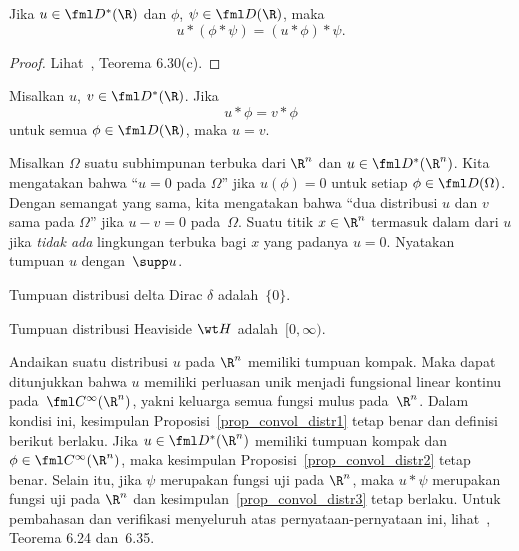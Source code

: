 \begin{prop}\label{prop_convol_distr3} Jika $u \in \fml D^*(\R)$ dan $\phi$, $\psi \in \fml D(\R)$, maka
   \[ u \ast (\phi \ast \psi) = (u \ast \phi) \ast \psi. \]
\end{prop}

\begin{proof} Lihat~\cite{Rudin:1991}, Teorema 6.30(c).  \ns
\end{proof}

\begin{prop} Misalkan $u$, $v \in \fml D^*(\R)$. Jika
   \[ u \ast \phi = v \ast \phi \]
untuk semua $\phi \in \fml D(\R)$, maka $ u = v$.
\end{prop}

\begin{defn} Misalkan $\Omega$ suatu subhimpunan terbuka dari $\R^n$ dan $u \in \fml D^*(\R^n)$. Kita mengatakan bahwa ``$u = 0$ pada $\Omega$'' jika $u(\phi) = 0$
untuk setiap $\phi \in \fml D(\Omega)$. Dengan semangat yang sama, kita mengatakan bahwa ``dua distribusi $u$ dan $v$ sama pada $\Omega$'' jika $u - v = 0$
pada~$\Omega$. Suatu titik $x \in \R^n$ termasuk dalam
 dari $u$ jika \emph{tidak ada} lingkungan terbuka bagi $x$ yang padanya $u = 0$. Nyatakan tumpuan $u$ dengan~$\supp u$.
\end{defn}

\begin{exam} Tumpuan distribusi delta Dirac $\delta$ adalah~$\{0\}$.
\end{exam}

\begin{exam} Tumpuan distribusi Heaviside $\wt H$ adalah~$[0,\infty)$.
\end{exam}

\begin{rem} Andaikan suatu distribusi $u$ pada $\R^n$ memiliki tumpuan kompak. Maka dapat ditunjukkan bahwa $u$ memiliki perluasan unik menjadi
fungsional linear kontinu pada~$\fml C^\infty(\R^n)$, yakni keluarga semua fungsi mulus pada~$\R^n$. Dalam kondisi ini, kesimpulan
Proposisi~\ref{prop_convol_distr1} tetap benar dan definisi berikut berlaku. Jika $u \in \fml D^*(\R^n)$ memiliki tumpuan kompak
dan $\phi \in \fml C^\infty(\R^n)$, maka kesimpulan Proposisi~\ref{prop_convol_distr2} tetap benar. Selain itu, jika $\psi$
merupakan fungsi uji pada $\R^n$, maka $u \ast \psi$ merupakan fungsi uji pada $\R^n$ dan kesimpulan~\ref{prop_convol_distr3} tetap berlaku.
Untuk pembahasan dan verifikasi menyeluruh atas pernyataan-pernyataan ini, lihat~\cite{Rudin:1991}, Teorema 6.24 dan~6.35.
\end{rem}

